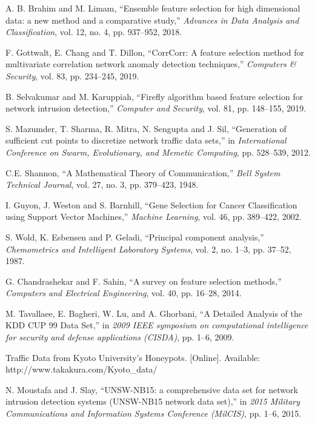 \documentclass{ieeeaccess}
\theoremstyle{definition}
\begin{document}
\begin{thebibliography}{00}
    A. B. Brahim and M. Limam, ``Ensemble feature selection for high dimensional data: a new method and a comparative study,'' \emph{Advances in Data Analysis and Classification}, vol. 12, no. 4, pp. 937--952, 2018.

    F. Gottwalt, E. Chang and T. Dillon, ``CorrCorr: A feature selection method for multivariate correlation network anomaly detection techniques,'' \emph{Computers \& Security}, vol. 83, pp. 234--245, 2019.

    B. Selvakumar and M. Karuppiah, ``Firefly algorithm based feature selection for network intrusion detection,'' \emph{Computer and Security}, vol. 81, pp. 148--155, 2019.

    S. Mazumder, T. Sharma, R. Mitra, N. Sengupta and J. Sil, ``Generation of sufficient cut points to discretize network traffic data sets,'' in \emph{International Conference on Swarm, Evolutionary, and Memetic Computing}, pp. 528--539, 2012.

    C.E. Shannon, ``A Mathematical Theory of Communication,'' \emph{Bell System Technical Journal}, vol. 27, no. 3, pp. 379--423, 1948.

    I. Guyon, J. Weston and S. Barnhill, ``Gene Selection for Cancer Classification using Support Vector Machines,'' \emph{Machine Learning}, vol. 46, pp. 389--422, 2002.

    S. Wold, K. Esbensen and P. Geladi, ``Principal component analysis,'' \emph{Chemometrics and Intelligent Laboratory Systems}, vol. 2, no. 1--3, pp. 37--52, 1987.

    G. Chandrashekar and F. Sahin, ``A survey on feature selection methods,'' \emph{Computers and Electrical Engineering}, vol. 40, pp. 16--28, 2014.

    M. Tavallaee, E. Bagheri, W. Lu, and A. Ghorbani, ``A Detailed Analysis of the KDD CUP 99 Data Set,'' in \emph{2009 IEEE symposium on computational intelligence for security and defense applications (CISDA)}, pp. 1--6, 2009.

    Traffic Data from Kyoto University's Honeypots. [Online]. Available: \\ http://www.takakura.com/Kyoto\_data/

    N. Moustafa and J. Slay, ``UNSW-NB15: a comprehensive data set for network intrusion detection systems (UNSW-NB15 network data set),'' in \emph{2015 Military Communications and Information Systems Conference (MilCIS)}, pp. 1--6, 2015.


\end{thebibliography}
\end{document}
